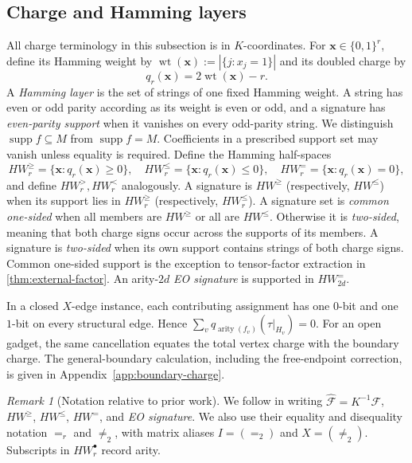\documentclass[11pt,letterpaper,onecolumn]{article}
\theoremstyle{plain}
\theoremstyle{definition}
\theoremstyle{remark}
\newtheorem{remark}[remark]{Remark}
\newcommand{\cF}{\mathcal F}
\newcommand{\wt}{\operatorname{wt}}
\newcommand{\supp}{\operatorname{supp}}
\newcommand{\arity}{\operatorname{arity}}
\newcommand{\Eq}{=}
\newcommand{\Neq}{\neq}
\begin{document}
\subsection{Charge and Hamming layers}
\label{subsec:charge}

All charge terminology in this subsection is in \(K\)-coordinates.
For \({\mathbf{x}}\in\{0,1\}^r\), define its Hamming weight by
\(\wt({\mathbf{x}}):=|\{j:x_j=1\}|\) and its doubled charge by
\[
  q_r({\mathbf{x}})=2\wt({\mathbf{x}})-r.
\]
A \emph{Hamming layer} is the set of strings of one fixed Hamming weight.  A
string has even or odd parity according as its weight is even or odd, and a
signature has \emph{even-parity support} when it vanishes on every odd-parity string.
We distinguish \(\supp f\subseteq M\) from \(\supp f=M\). Coefficients
in a prescribed support set may vanish unless equality is required.
Define the Hamming half-spaces
\[
  HW_r^{\ge}=\{{\mathbf{x}}:q_r({\mathbf{x}})\ge0\},
  \quad
  HW_r^{\le}=\{{\mathbf{x}}:q_r({\mathbf{x}})\le0\},
  \quad
  HW_r^{=}=\{{\mathbf{x}}:q_r({\mathbf{x}})=0\},
\]
and define \(HW_r^{>},HW_r^{<}\) analogously.  A signature is
\(HW^{\ge}\) (respectively, \(HW^{\le}\)) when its support lies in
\(HW_r^{\ge}\) (respectively, \(HW_r^{\le}\)).  A signature set is \emph{common
one-sided} when all members are \(HW^{\ge}\) or all are \(HW^{\le}\).
Otherwise it is \emph{two-sided}, meaning that both charge signs occur
across the supports of its members. A signature is \emph{two-sided} when its own
support contains strings of both charge signs. Common one-sided support
is the exception to tensor-factor extraction in \cref{thm:external-factor}.
An arity-\(2d\) \emph{EO signature} is supported in \(HW_{2d}^=\).

In a closed \(X\)-edge instance, each contributing assignment has one
\(0\)-bit and one \(1\)-bit on every structural edge. Hence
\(\sum_v q_{\arity(f_v)}(\tau|_{H_v})=0\).
For an open gadget, the same cancellation equates the total vertex charge
with the boundary charge. The general-boundary calculation, including
the free-endpoint correction, is given in
Appendix~\ref{app:boundary-charge}.

\begin{remark}[Notation relative to prior work]
\label{rem:mwxz-notation}
We follow \cite[Sections~2.1--2.3]{MengWangXiaZheng2025} in writing
\(\widehat{\cF}=K^{-1}\cF\), \(HW^{\ge}\), \(HW^{\le}\), \(HW^=\),
and \emph{EO signature}.  We also use their equality and disequality notation \(\Eq_r\) and
\(\Neq_2\), with matrix aliases \(I=(\Eq_2)\) and \(X=(\Neq_2)\).
Subscripts in \(HW_r^\bullet\) record arity.

\end{remark}
\end{document}
